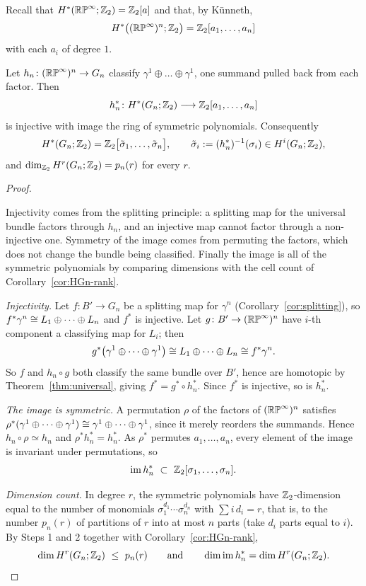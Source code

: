 Recall that $H^*(\mathbb{RP}^\infty;\mathbb{Z}_2)=\mathbb{Z}_2[a]$ and that, by K\"unneth,
\[
H^*\big((\mathbb{RP}^\infty)^n;\mathbb{Z}_2\big)=\mathbb{Z}_2[a_1,\dots,a_n]
\]
with each $a_i$ of degree $1$.

\begin{theorem}\label{thm:HGn}
Let $h_n\colon(\mathbb{RP}^\infty)^n\to G_n$ classify
$\gamma^1\oplus\dots\oplus\gamma^1$, one summand pulled back from each factor.
Then
\[
h_n^*\colon H^*(G_n;\mathbb{Z}_2)\longrightarrow\mathbb{Z}_2[a_1,\dots,a_n]
\]
is injective with image the ring of symmetric polynomials. Consequently
\[
H^*(G_n;\mathbb{Z}_2)=\mathbb{Z}_2\big[\tilde\sigma_1,\dots,\tilde\sigma_n\big],
\qquad
\tilde\sigma_i:=(h_n^*)^{-1}(\sigma_i)\in H^i(G_n;\mathbb{Z}_2),
\]
and $\dim_{\mathbb{Z}_2}H^r(G_n;\mathbb{Z}_2)=p_n(r)$ for every $r$.
\end{theorem}

\begin{proof}
\begin{strategy}
Injectivity comes from the splitting principle: a splitting map for the
universal bundle factors through $h_n$, and an injective map cannot factor
through a non-injective one. Symmetry of the image comes from permuting the
factors, which does not change the bundle being classified. Finally the image is
all of the symmetric polynomials by comparing dimensions with the cell count of
Corollary~\ref{cor:HGn-rank}.
\end{strategy}

 \emph{Injectivity.} Let $f\colon B'\to G_n$ be a splitting map for
$\gamma^n$ (Corollary~\ref{cor:splitting}), so
$f^*\gamma^n\cong L_1\oplus\dots\oplus L_n$ and $f^*$ is injective. Let
$g\colon B'\to(\mathbb{RP}^\infty)^n$ have $i$-th component a classifying map for
$L_i$; then
\[
g^*\big(\gamma^1\oplus\dots\oplus\gamma^1\big)\cong L_1\oplus\dots\oplus L_n
\cong f^*\gamma^n .
\]
So $f$ and $h_n\circ g$ both classify the same bundle over $B'$, hence are
homotopic by Theorem~\ref{thm:universal}, giving $f^*=g^*\circ h_n^*$. Since
$f^*$ is injective, so is $h_n^*$.

 \emph{The image is symmetric.} A permutation $\rho$ of the factors of
$(\mathbb{RP}^\infty)^n$ satisfies
$\rho^*(\gamma^1\oplus\dots\oplus\gamma^1)\cong\gamma^1\oplus\dots\oplus\gamma^1$,
since it merely reorders the summands. Hence $h_n\circ\rho\simeq h_n$ and
$\rho^*h_n^*=h_n^*$. As $\rho^*$ permutes $a_1,\dots,a_n$, every element of the
image is invariant under permutations, so
\[
\im h_n^*\ \subset\ \Z_2[\sigma_1,\dots,\sigma_n].
\]

 \emph{Dimension count.} In degree $r$, the symmetric polynomials have
$\mathbb{Z}_2$-dimension equal to the number of monomials
$\sigma_1^{d_1}\cdots\sigma_n^{d_n}$ with $\sum i\,d_i=r$, that is, to the
number $p_n(r)$ of partitions of $r$ into at most $n$ parts (take $d_i$ parts
equal to $i$). By Steps 1 and 2 together with
Corollary~\ref{cor:HGn-rank},
\[
\dim H^r(G_n;\mathbb{Z}_2)\ \le\ p_n(r)
\qquad\text{and}\qquad
\dim \operatorname{im} h_n^*=\dim H^r(G_n;\mathbb{Z}_2).
\]


\end{proof}
